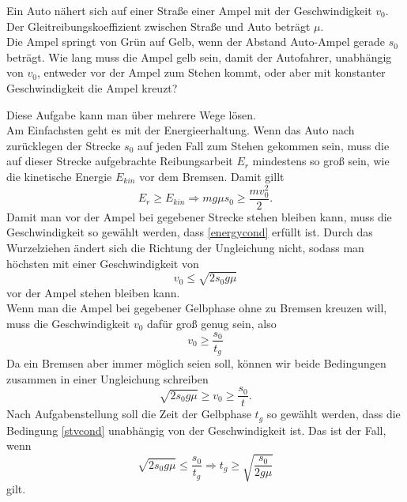\begin{Exercise}[label = ampel, title = Gute Ampel, difficulty = 2, origin = Alte IPhO-Aufgabe ]
	Ein Auto nähert sich auf einer Straße einer Ampel mit der Geschwindigkeit $v_0$.  Der Gleitreibungskoeffizient zwischen Straße und Auto beträgt $\mu$.\\ Die Ampel springt von Grün auf Gelb, wenn der Abstand Auto-Ampel gerade $s_0$ beträgt. Wie lang muss die Ampel gelb sein, damit der Autofahrer, unabhängig von $v_0$, entweder vor der Ampel zum Stehen kommt, oder aber mit konstanter Geschwindigkeit die Ampel kreuzt?
\end{Exercise}	
\begin{Answer}[ref = ampel]
	Diese Aufgabe kann man über mehrere Wege lösen.\\
	 Am Einfachsten geht es mit der Energieerhaltung. Wenn das Auto nach zurücklegen der Strecke $s_0$ auf jeden Fall zum Stehen gekommen sein, muss die auf dieser Strecke aufgebrachte Reibungsarbeit $E_r$ mindestens so groß sein, wie die kinetische Energie $E_{kin}$ vor dem Bremsen. Damit gillt
	 \begin{equation}\label{energycond}
	 E_{r} \geq E_{kin} \Rightarrow mg\mu s_0 \geq \frac{mv_0^2}{2}.
	 \end{equation}
	 Damit man vor der Ampel bei gegebener Strecke stehen bleiben kann, muss die Geschwindigkeit so gewählt werden, dass \eqref{energycond} erfüllt ist. Durch das Wurzelziehen ändert sich die Richtung der Ungleichung nicht, sodass man höchsten mit einer Geschwindigkeit von 
	 \begin{equation}\label{vfriccond}
	 	v_0\leq \sqrt{2s_0g\mu}
	 \end{equation}
	 vor der Ampel stehen bleiben kann.\\
	 Wenn man die Ampel bei gegebener Gelbphase ohne zu Bremsen kreuzen will, muss die Geschwindigkeit $v_0$ dafür groß genug sein, also
	 \begin{equation}\label{velcond}
	 	v_0 \geq  \frac{s_0}{t_g}
	 \end{equation}
	Da ein Bremsen aber immer möglich seien soll, können wir beide Bedingungen zusammen in einer Ungleichung schreiben
	\begin{equation}\label{stvcond}
		\sqrt{2s_0g\mu}\geq v_0 \geq \frac{s_0}{t}.
	\end{equation}
	Nach Aufgabenstellung soll die Zeit der Gelbphase $t_g$ so gewählt werden, dass die Bedingung \eqref{stvcond} unabhängig von der Geschwindigkeit ist. Das ist der Fall, wenn
	\begin{equation}\label{energytcond}
	\boxed{
	\sqrt{2s_0g\mu} \leq \frac{s_0}{t_g} \Rightarrow t_g \geq  \sqrt{\frac{s_0}{2g\mu}}}
	\end{equation}
	gilt.
\end{Answer}
